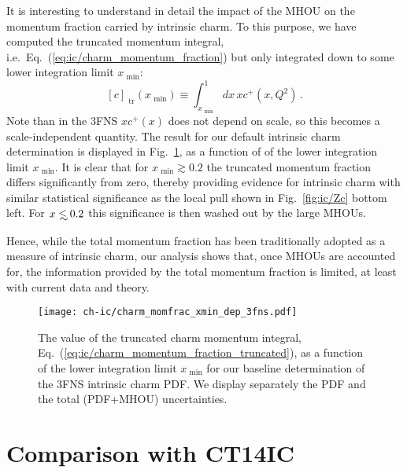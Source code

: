It is interesting to understand in detail the impact of the MHOU on
the momentum fraction carried by intrinsic charm. To this purpose, we
have computed  the truncated momentum integral, i.e.\ 
  Eq.~(\ref{eq:ic/charm_momentum_fraction}) but only integrated down to
  some  lower
  integration limit $x_\textrm{ min}$:
  \begin{equation}
\label{eq:ic/charm_momentum_fraction_truncated}
\left[ c\right]_\textrm{ tr}(x_\textrm{ min}) \equiv \int_{x_\textrm{ min}}^1dx\, x c^+(x,Q^2) \, .
\end{equation}
Note than in the 3FNS   $x
c^+(x)$ does not depend on scale, so  this becomes
a scale-independent quantity.
%
The result for our default intrinsic charm determination is displayed
in Fig.~\ref{fig:ic/charm_momfrac_xmin_dep}, as a function of
of the lower integration limit $x_\textrm{ min}$.
%
It is clear that for $x_\textrm{ min} \gtrsim 0.2$ the truncated momentum
fraction  differs significantly from zero, thereby providing evidence
for intrinsic charm with similar statistical  significance as the
local pull shown in Fig.~\ref{fig:ic/Zc} bottom left.
%
For $x \lsim 0.2$
this  significance is then washed out
by the large MHOUs.

Hence, while the total momentum fraction has been traditionally adopted
as a measure of intrinsic charm, 
our analysis shows that, once MHOUs are accounted for, the information
provided by the total momentum fraction is limited, at least with
current data and theory.



\begin{figure}[h!]
  \begin{center}
    \texttt{[image: ch-ic/charm\_momfrac\_xmin\_dep\_3fns.pdf]}
    \caption{\small The value of the truncated charm momentum integral,
      Eq.~(\ref{eq:ic/charm_momentum_fraction_truncated}), as a function
      of the lower integration limit $x_\textrm{ min}$
      for our baseline determination of the 3FNS intrinsic charm PDF.
      We display separately the PDF and the total (PDF+MHOU) uncertainties.
  \label{fig:ic/charm_momfrac_xmin_dep} }
\end{center}
\end{figure}



\section{Comparison with  CT14IC}
\label{app:ic/ct}

